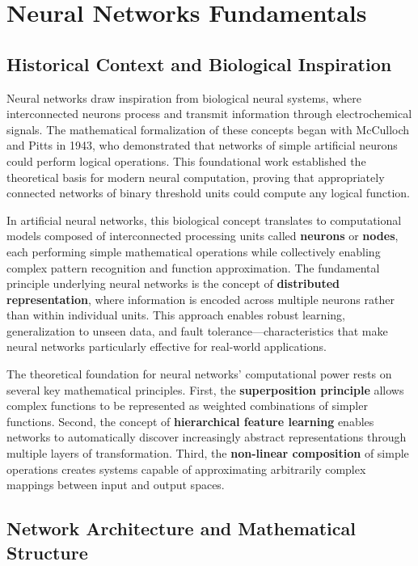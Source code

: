 \documentclass[11pt,a4paper]{report}
\begin{document}
\section{Neural Networks Fundamentals}

\subsection{Historical Context and Biological Inspiration}

Neural networks draw inspiration from biological neural systems, where interconnected neurons process and transmit information through electrochemical signals. The mathematical formalization of these concepts began with McCulloch and Pitts in 1943, who demonstrated that networks of simple artificial neurons could perform logical operations. This foundational work established the theoretical basis for modern neural computation, proving that appropriately connected networks of binary threshold units could compute any logical function.

In artificial neural networks, this biological concept translates to computational models composed of interconnected processing units called \textbf{neurons} or \textbf{nodes}, each performing simple mathematical operations while collectively enabling complex pattern recognition and function approximation. The fundamental principle underlying neural networks is the concept of \textbf{distributed representation}, where information is encoded across multiple neurons rather than within individual units. This approach enables robust learning, generalization to unseen data, and fault tolerance—characteristics that make neural networks particularly effective for real-world applications.

The theoretical foundation for neural networks' computational power rests on several key mathematical principles. First, the \textbf{superposition principle} allows complex functions to be represented as weighted combinations of simpler functions. Second, the concept of \textbf{hierarchical feature learning} enables networks to automatically discover increasingly abstract representations through multiple layers of transformation. Third, the \textbf{non-linear composition} of simple operations creates systems capable of approximating arbitrarily complex mappings between input and output spaces.

\subsection{Network Architecture and Mathematical Structure}
\end{document}
